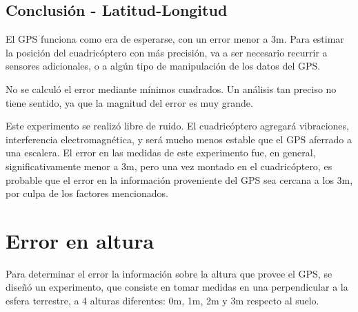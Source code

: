 \documentclass[spanish,12pt,a4paper,titlepage]{report}
\begin{document}
\subsection{Conclusión - Latitud-Longitud}
\label{sec:error-lat-lon-conclusion}

El GPS funciona como era de esperarse, con un error menor a 3m. Para estimar la posición del cuadricóptero con más precisión, va a ser necesario recurrir a sensores adicionales, o a algún tipo de manipulación de los datos del GPS.

No se calculó el error mediante mínimos cuadrados. Un análisis tan preciso no tiene sentido, ya que la magnitud del error es muy grande.

Este experimento se realizó libre de ruido. El cuadricóptero agregará vibraciones, interferencia electromagnética, y será mucho menos estable que el GPS aferrado a una escalera. El error en las medidas de este experimento fue, en general, significativamente menor a 3m, pero una vez montado en el cuadricóptero, es probable que el error en la información proveniente del GPS sea cercana a los 3m, por culpa de los factores mencionados.

%
%

\section{Error en altura}
\label{sec:error-en-altura}

Para determinar el error la información sobre la altura que provee el GPS, se diseñó un experimento, que consiste en tomar medidas en una perpendicular a la esfera terrestre, a 4 alturas diferentes: 0m, 1m, 2m y 3m respecto al suelo.
\end{document}
